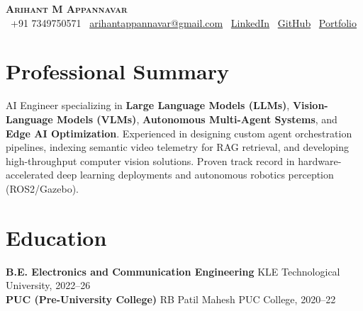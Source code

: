 \documentclass[a4paper,11pt]{article}
\begin{document}
\begin{center}
    {\LARGE \textbf{\scshape Arihant M Appannavar}} \\[3pt]
    \small
    \color{black}
    \faPhone\ +91 7349750571 \quad
    \faEnvelope\ \href{mailto:arihantappannavar@gmail.com}{arihantappannavar@gmail.com} \quad
    \faLinkedin\ \href{https://www.linkedin.com/in/arihant-appannavar-6635063a0/}{LinkedIn} \quad
    \faGithub\ \href{https://github.com/Arihant3704}{GitHub} \quad
    \faGlobe\ \href{https://arihant3704.github.io}{Portfolio}
\end{center}

\vspace{2pt}

\section*{\color{linkblue}Professional Summary}
\small
\vspace{2pt}
AI Engineer specializing in \textbf{Large Language Models (LLMs)}, \textbf{Vision-Language Models (VLMs)}, \textbf{Autonomous Multi-Agent Systems}, and \textbf{Edge AI Optimization}. Experienced in designing custom agent orchestration pipelines, indexing semantic video telemetry for RAG retrieval, and developing high-throughput computer vision solutions. Proven track record in hardware-accelerated deep learning deployments and autonomous robotics perception (ROS2/Gazebo).
\vspace{3pt}

\section*{\color{linkblue}Education}
\small
\vspace{2pt}
\textbf{B.E. Electronics and Communication Engineering} \hfill KLE Technological University, 2022--26 \\
\textbf{PUC (Pre-University College)} \hfill RB Patil Mahesh PUC College, 2020--22
\vspace{3pt}

\end{document}

